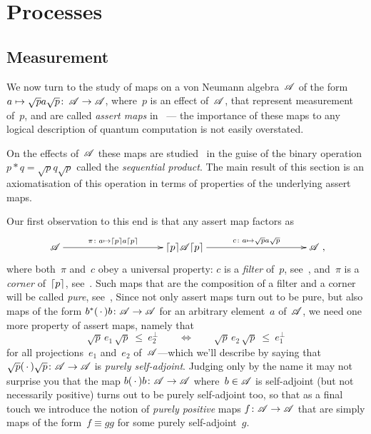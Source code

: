 \documentclass[a]{subfiles}
\begin{document}
\chapter{Processes}

\section{Measurement}
\begin{point}%
We now turn to the study of
maps on a von Neumann algebra~$\mathscr{A}$
of the form
$a\mapsto \sqrt{p}a\sqrt{p}\colon\,\mathscr{A}\to\mathscr{A}$,
where~$p$ is an effect of~$\mathscr{A}$,
that represent measurement of~$p$,
and are called \emph{assert maps} in~
--- the importance of these maps 
to any logical description of
quantum computation is not easily overstated.

On the effects of~$\mathscr{A}$
these maps are studied~ in the guise
of the binary operation
$p\ast q=\sqrt{p} q \sqrt{p}$
called the \emph{sequential product}.
The main result of this section
is an axiomatisation of this operation
in terms of properties
of the underlying assert maps.

Our first observation
to this end
is that any assert map factors as
\begin{equation*}
\xymatrix@C=10em{
\scrA
\ar[r]^-{\pi\colon a\mapsto \ceil{p}a\ceil{p}}
&
\ceil{p}\!\scrA\!\ceil{p}
\ar[r]^-{c\colon a\mapsto \sqrt{p}a\sqrt{p}}
&
\scrA
},
\end{equation*}
where both~$\pi$ and~$c$ obey a universal property:
$c$ is a \emph{filter} of~$p$, see~,
and~$\pi$ is a \emph{corner} of~$\left\lceil p\right\rceil$, see~.
Such maps
that are the composition of a filter and a corner
will be called \emph{pure}, see~,
Since not only assert maps turn out to be pure, but also maps of the form
$b^*(\,\cdot\,)b\colon \mathscr{A}\to\mathscr{A}$ for an arbitrary element~$a$
of~$\mathscr{A}$,
we need one more property of assert maps, namely
that
\begin{equation*}
	\sqrt{p}\,e_1\,\sqrt{p}\ \leq\  e_2^\perp 
	\qquad\iff\qquad
	\sqrt{p}\,e_2 \,\sqrt{p}\ \leq\  e_1^\perp
\end{equation*}
for all projections~$e_1$ and~$e_2$ of~$\mathscr{A}$---which we'll
describe by saying that $\sqrt{p}(\,\cdot\,)\sqrt{p}\colon \mathscr{A}\to\mathscr{A}$
is \emph{purely self-adjoint}.
Judging only by the name
it may not surprise you that the map $b(\,\cdot\,)b\colon \mathscr{A}\to\mathscr{A}$
where~$b\in \mathscr{A}$ is self-adjoint (but not necessarily positive)
turns out to be purely self-adjoint too,
so that as a final touch we introduce the notion
of \emph{purely positive} maps $f\colon \mathscr{A}\to\mathscr{A}$
that are simply maps of the form~$f\equiv gg$ for some purely self-adjoint~$g$.


\end{point}
\end{document}
